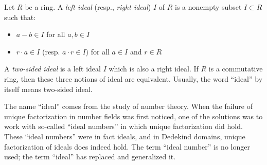 \documentclass{article}
\begin{document}
Let $R$ be a ring. A \emph{left ideal} (resp., \emph{right ideal}) $I$ of $R$ is a nonempty subset $I \subset R$ such that:
\begin{itemize}
\item $a-b \in I$ for all $a,b \in I$
\item $r \cdot a \in I$ (resp. $a \cdot r \in I$) for all $a \in I$ and $r \in R$
\end{itemize}
A \emph{two-sided ideal} is a left ideal $I$ which is also a right ideal. If $R$ is a commutative ring, then these three notions of ideal are equivalent. Usually, the word ``ideal'' by itself means two-sided ideal.

The name ``ideal'' comes from the study of number theory.  When the failure of unique factorization in number fields was first noticed, one of the solutions was to work with so-called ``ideal numbers'' in which unique factorization did hold.  These ``ideal numbers'' were in fact ideals, and in Dedekind domains, unique factorization of ideals does indeed hold.  The term ``ideal number'' is no longer used; the term ``ideal'' has replaced and generalized it.
\end{document}
